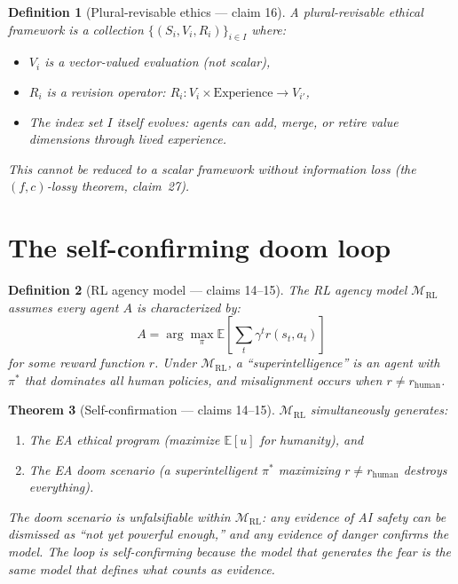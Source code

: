\documentclass[11pt,a4paper]{article}
\newtheorem{definition}{Definition}[section]
\newtheorem{theorem}[definition]{Theorem}
\begin{document}
\begin{definition}[Plural-revisable ethics --- claim 16]
\label{def:plural-ethics}
A \emph{plural-revisable ethical framework} is a collection
$\{(S_i, V_i, R_i)\}_{i \in I}$ where:
\begin{itemize}
\item $V_i$ is a \emph{vector-valued} evaluation (not scalar),
\item $R_i$ is a revision operator: $R_i : V_i \times \text{Experience} \to V_{i'}$,
\item The index set $I$ itself evolves: agents can add, merge, or retire
  value dimensions through lived experience.
\end{itemize}
This cannot be reduced to a scalar framework without information loss
(the $(f,c)$-lossy theorem, claim~27).
\end{definition}

\section{The self-confirming doom loop}
\label{sec:doom-loop}

\begin{definition}[RL agency model --- claims 14--15]
\label{def:rl-agency}
The \emph{RL agency model} $\mathcal{M}_{\text{RL}}$ assumes every agent
$A$ is characterized by:
\[
  A = \arg\max_{\pi} \mathbb{E}\left[\sum_t \gamma^t r(s_t, a_t)\right]
\]
for some reward function $r$. Under $\mathcal{M}_{\text{RL}}$, a
``superintelligence'' is an agent with $\pi^*$ that dominates all
human policies, and misalignment occurs when $r \neq r_{\text{human}}$.
\end{definition}

\begin{theorem}[Self-confirmation --- claims 14--15]
\label{thm:self-confirm}
$\mathcal{M}_{\text{RL}}$ simultaneously generates:
\begin{enumerate}
\item The EA ethical program (maximize $\mathbb{E}[u]$ for humanity), and
\item The EA doom scenario (a superintelligent $\pi^*$ maximizing
  $r \neq r_{\text{human}}$ destroys everything).
\end{enumerate}
The doom scenario is \emph{unfalsifiable within $\mathcal{M}_{\text{RL}}$}:
any evidence of AI safety can be dismissed as ``not yet powerful enough,''
and any evidence of danger confirms the model. The loop is self-confirming
because the model that generates the fear is the same model that defines
what counts as evidence.
\end{theorem}
\end{document}
